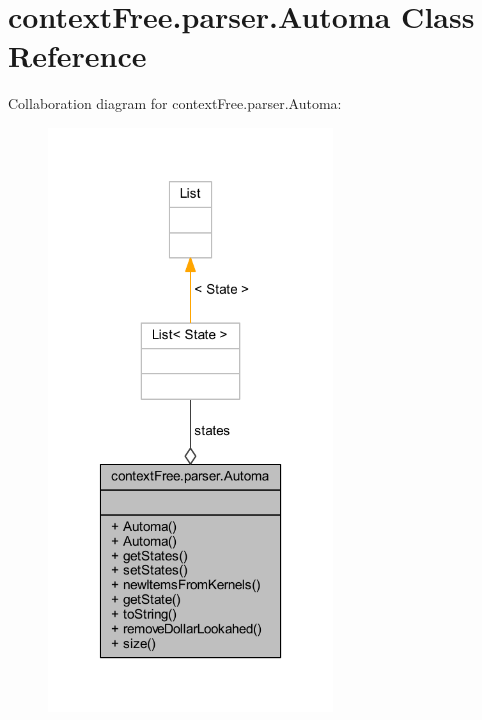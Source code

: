 \hypertarget{classcontext_free_1_1parser_1_1_automa}{\section{context\-Free.\-parser.\-Automa Class Reference}
\label{classcontext_free_1_1parser_1_1_automa}
}


Collaboration diagram for context\-Free.\-parser.\-Automa\-:
\nopagebreak
\begin{figure}[H]
\begin{center}
\leavevmode
\includegraphics[width=214pt]{classcontext_free_1_1parser_1_1_automa__coll__graph}
\end{center}
\end{figure}
